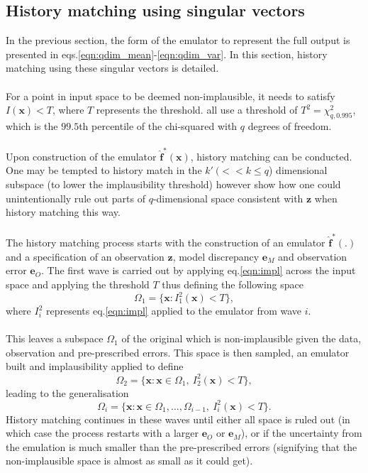 \documentclass{article}
\newcommand{\numOutputs}{q}
\newcommand{\emulator}{\hat{f}}
\newcommand{\inputVec}{\mathbf{x}}
\newcommand{\obsqD}{\mathbf{z}}
\newcommand{\obsErrorqD}{\mathbf{e}_O}
\newcommand{\modelDiscqD}{\mathbf{e}_M}
\newcommand{\impl}{I}
\newcommand{\NROYspace}{\Omega}
\newcommand{\matRank}{k}
\newcommand{\thresh}{T}
\begin{document}
\subsection{History matching using singular vectors}
\label{hm-singVec}
In the previous section, the form of the emulator to represent the full output is presented in eqs.\eqref{eqn:qdim_mean}-\eqref{eqn:qdim_var}. In this section, history matching using these singular vectors is detailed.\\\\
For a point in input space to be deemed non-implausible, it needs to satisfy $\impl(\inputVec) < \thresh$, where $\thresh$ represents the threshold. \citet{Vernon2010,Andrianakis2015,Salter2019} all use a threshold of $\thresh^2 = \chi_{\numOutputs,0.995}^2$, which is the $99.5$th percentile of the chi-squared with $\numOutputs$ degrees of freedom.\\\\
Upon construction of the emulator $\mathbf{\emulator}^*(\inputVec)$, history matching can be conducted. One may be tempted to history match in the $\matRank' \ (<< \matRank \leq \numOutputs$) dimensional subspace (to lower the implausibility threshold) however \citet{Salter2019} show how one could unintentionally rule out parts of $\numOutputs$-dimensional space consistent with $\obsqD$ when history matching this way.\\\\
The history matching process starts with the construction of an emulator $\mathbf{\emulator}^*(.)$ and a specification of an observation $\obsqD$, model discrepancy $\modelDiscqD$ and observation error $\obsErrorqD$. The first wave is carried out by applying eq.\eqref{eqn:impl} across the input space and applying the threshold $\thresh$ thus defining the following space \[\NROYspace_1 = \{\inputVec : \impl_1^2(\inputVec) < \thresh \},\] where $\impl_i^2$ represents eq.\eqref{eqn:impl} applied to the emulator from wave $i$.\\\\
This leaves a subspace $\NROYspace_1$ of the original which is non-implausible given the data, observation and pre-prescribed errors. This space is then sampled, an emulator built and implausibility applied to define \[\NROYspace_2 = \{\inputVec: \inputVec \in \NROYspace_1, \ \impl_2^2(\inputVec) < \thresh \},\] leading to the generalisation \[\NROYspace_i = \{\inputVec: \inputVec \in \NROYspace_1,\dots,\NROYspace_{i-1}, \ \impl_i^2(\inputVec) < \thresh \}.\] History matching continues in these waves until either all space is ruled out (in which case the process restarts with a larger $\obsErrorqD$ or $\modelDiscqD$), or if the uncertainty from the emulation is much smaller than the pre-prescribed errors (signifying that the non-implausible space is almost as small as it could get).
\end{document}
